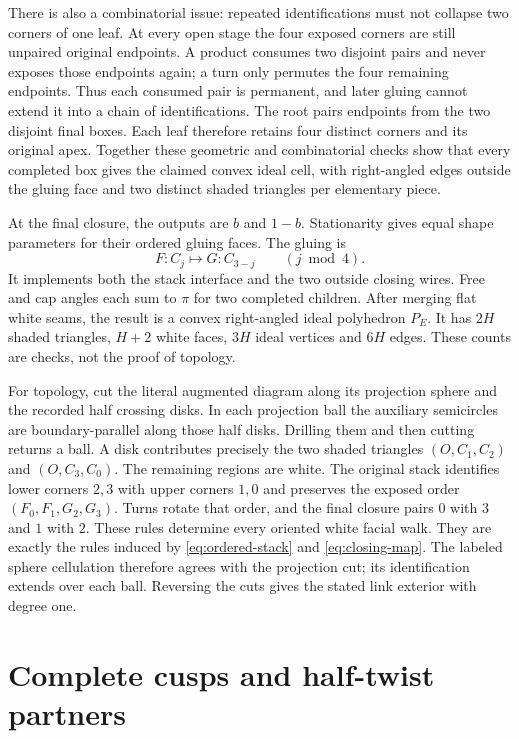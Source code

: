 There is also a combinatorial issue: repeated identifications must not collapse two corners of one leaf. At every open stage the four exposed corners are still unpaired original endpoints. A product consumes two disjoint pairs and never exposes those endpoints again; a turn only permutes the four remaining endpoints. Thus each consumed pair is permanent, and later gluing cannot extend it into a chain of identifications. The root pairs endpoints from the two disjoint final boxes. Each leaf therefore retains four distinct corners and its original apex. Together these geometric and combinatorial checks show that every completed box gives the claimed convex ideal cell, with right-angled edges outside the gluing face and two distinct shaded triangles per elementary piece.

At the final closure, the outputs are $b$ and $1-b$. Stationarity gives equal shape parameters for their ordered gluing faces. The gluing is
\begin{equation}\label{eq:closing-map}
 F:C_j\longmapsto G:C_{3-j}\qquad(j\bmod4).
\end{equation}
It implements both the stack interface and the two outside closing wires. Free and cap angles each sum to $\pi$ for two completed children. After merging flat white seams, the result is a convex right-angled ideal polyhedron $P_E$. It has $2H$ shaded triangles, $H+2$ white faces, $3H$ ideal vertices and $6H$ edges. These counts are checks, not the proof of topology.

For topology, cut the literal augmented diagram along its projection sphere and the recorded half crossing disks. In each projection ball the auxiliary semicircles are boundary-parallel along those half disks. Drilling them and then cutting returns a ball. A disk contributes precisely the two shaded triangles $(O,C_1,C_2)$ and $(O,C_3,C_0)$. The remaining regions are white. The original stack identifies lower corners $2,3$ with upper corners $1,0$ and preserves the exposed order $(F_0,F_1,G_2,G_3)$. Turns rotate that order, and the final closure pairs $0$ with $3$ and $1$ with $2$. These rules determine every oriented white facial walk. They are exactly the rules induced by \eqref{eq:ordered-stack} and \eqref{eq:closing-map}. The labeled sphere cellulation therefore agrees with the projection cut; its identification extends over each ball. Reversing the cuts gives the stated link exterior with degree one.

\section{Complete cusps and half-twist partners}

